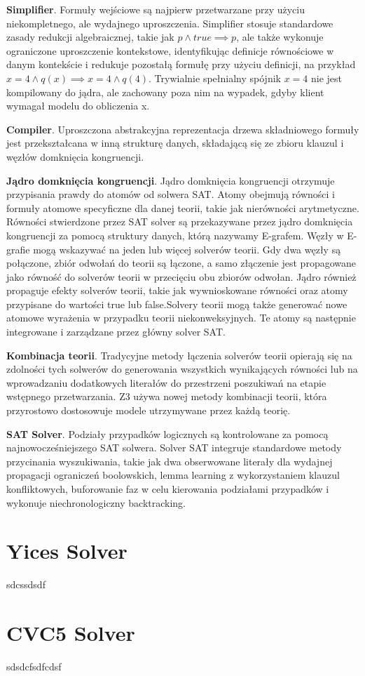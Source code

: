 \textbf{Simplifier}. Formuły wejściowe są najpierw przetwarzane przy użyciu niekompletnego, ale wydajnego uproszczenia. Simplifier stosuje standardowe zasady redukcji algebraicznej, takie jak $p \land true \implies p$, ale także wykonuje ograniczone uproszczenie kontekstowe, identyfikując definicje równościowe w danym kontekście i redukuje pozostałą formułę przy użyciu definicji, na przykład $x = 4 \land q(x) \implies x = 4 \land q(4)$. Trywialnie spełnialny spójnik $x = 4$ nie jest kompilowany do jądra, ale zachowany poza nim na wypadek, gdyby klient wymagał modelu do obliczenia x.

\textbf{Compiler}. Uproszczona abstrakcyjna reprezentacja drzewa składniowego formuły jest przekształcana w inną strukturę danych, składającą się ze zbioru klauzul i węzłów domknięcia kongruencji.

\textbf{Jądro domknięcia kongruencji}. Jądro domknięcia kongruencji otrzymuje przypisania prawdy do atomów od solwera SAT. Atomy obejmują równości i formuły atomowe specyficzne dla danej teorii, takie jak nierówności arytmetyczne. Równości stwierdzone przez SAT solver są przekazywane przez jądro domknięcia kongruencji za pomocą struktury danych, którą nazywamy E-grafem. Węzły w E-grafie mogą wskazywać na jeden lub więcej solverów teorii. Gdy dwa węzły są połączone, zbiór odwołań do teorii są łączone, a samo złączenie jest propagowane jako równość do solverów teorii w przecięciu obu zbiorów odwołan. Jądro również propaguje efekty solverów teorii, takie jak wywnioskowane równości oraz atomy przypisane do wartości true lub false.Solvery teorii mogą także generować nowe atomowe wyrażenia w przypadku teorii niekonweksyjnych. Te atomy są następnie integrowane i zarządzane przez główny solver SAT.

\textbf{Kombinacja teorii}. Tradycyjne metody łączenia solverów teorii opierają się na zdolności tych solwerów do generowania wszystkich wynikających równości lub na wprowadzaniu dodatkowych literałów do przestrzeni poszukiwań na etapie wstępnego przetwarzania. Z3 używa nowej metody kombinacji teorii, która przyrostowo dostosowuje modele utrzymywane przez każdą teorię.

\textbf{SAT Solver}. Podziały przypadków logicznych są kontrolowane za pomocą najnowocześniejszego SAT solwera. Solver SAT integruje standardowe metody przycinania wyszukiwania, takie jak dwa obserwowane literały dla wydajnej propagacji ograniczeń boolowskich, lemma learning z wykorzystaniem klauzul konfliktowych, buforowanie faz w celu kierowania podziałami przypadków i wykonuje niechronologiczny backtracking.

\section{Yices Solver}
sdcssdsdf

\section{CVC5 Solver}
sdsdcfsdfcdsf